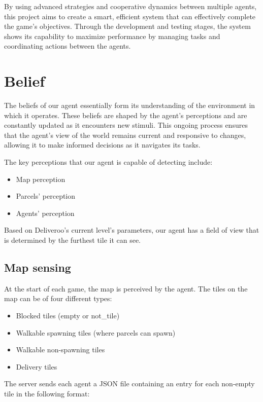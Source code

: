 \documentclass[12pt]{article}
\begin{document}
By using advanced strategies and cooperative dynamics between multiple agents, this project aims to create a smart, efficient system that can effectively complete the game's objectives. Through the development and testing stages, the system shows its capability to maximize performance by managing tasks and coordinating actions between the agents.

\section{Belief}

The beliefs of our agent essentially form its understanding of the environment in which it operates. These beliefs are shaped by the agent's perceptions and are constantly updated as it encounters new stimuli. This ongoing process ensures that the agent's view of the world remains current and responsive to changes, allowing it to make informed decisions as it navigates its tasks.

The key perceptions that our agent is capable of detecting include:

\begin{itemize}
    \item Map perception
    \item Parcels' perception
    \item Agents' perception
\end{itemize}

Based on Deliveroo's current level's parameters, our agent has a field of view that is determined by the furthest tile it can see.

\subsection{Map sensing}

At the start of each game, the map is perceived by the agent. The tiles on the map can be of four different types:

\begin{itemize}
    \item Blocked tiles (empty or not\_tile)
    \item Walkable spawning tiles (where parcels can spawn)
    \item Walkable non-spawning tiles
    \item Delivery tiles
\end{itemize}

The server sends each agent a JSON file containing an entry for each non-empty tile in the following format:
\end{document}
